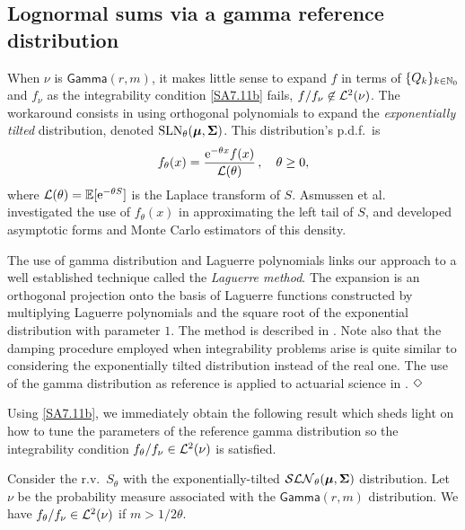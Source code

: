 \subsection{Lognormal sums via a gamma reference distribution} \label{SS:LNGammaNu}

When $\nu$ is $\mathsf{Gamma}(r,m)$, it makes little sense to expand $f$ in terms of $\{Q_{k}\}_{k\in\mathbb{N}_0}$ and $f_\nu$ as the integrability condition \eqref{SA7.11b} fails, $f/f_\nu \not\in\mathcal{L}^{2}(\nu)$. The workaround consists in using orthogonal polynomials to expand the \emph{exponentially tilted} distribution, denoted $\mathrm{SLN}_\theta(\bm{\mu}, \bm{\Sigma})$. This distribution's p.d.f.\ is
\begin{equation}\label{ExponentiallyTiltedPDF}
f_\theta(x) = \frac{\mathrm{e}^{-\theta x}f(x)}{\mathcal{L}(\theta)} \,,\quad \theta \ge 0,
\end{equation}
where $\mathcal{L}(\theta)=\operatorname{{\mathbb E}}[\mathrm{e}^{-\theta S}]$ is the Laplace transform of $S$. Asmussen et al.\ \cite{asmussen2015exponential} investigated the use of $f_\theta(x)$ in approximating the left tail of $S$, and developed asymptotic forms and Monte Carlo estimators of this density.
\begin{remark}
The use of gamma distribution and Laguerre polynomials links our approach to a well established technique called the \emph{Laguerre method}. The expansion is an orthogonal projection onto the basis of Laguerre functions constructed by multiplying Laguerre polynomials and the square root of the exponential distribution with parameter $1$. The method is described in \cite{AbChWh95}. Note also that the damping procedure employed when integrability problems arise is quite similar to considering the exponentially tilted distribution instead of the real one. The use of the gamma distribution as reference is applied to actuarial science in \cite{GoLoPo15a,GoLoPo15b}.
$\hfill \Diamond$
\end{remark}
Using \eqref{SA7.11b}, we immediately obtain the following result which
sheds light on how to tune the parameters of the reference gamma distribution so the integrability condition $f_\theta / f_\nu \in\mathcal{L}^2(\nu)$ is satisfied.
\begin{proposition}\label{pr:IntegrabiltyConditionWRTGammaDistribution}
Consider the r.v.\ $S_\theta$ with the exponentially-tilted $\mathcal{SLN}_\theta(\boldsymbol{\mu},\bm{\Sigma})$ distribution. Let $\nu$ be the probability measure associated with the $\mathsf{Gamma}(r,m)$ distribution. We have $f_\theta/f_\nu \in\mathcal{L}^2(\nu)$ if
$m>1/2\theta$.
\end{proposition}

